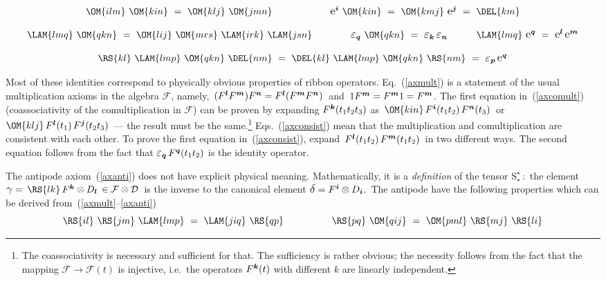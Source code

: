 \documentclass[12pt]{article}
\newcommand{\Del}{\mbox{\large$\delta$}}
\newcommand{\Gam}{\mbox{\large$\gamma$}}
\newcommand{\Eps}{\mbox{\large$\varepsilon$}}
\newcommand{\rE}{\mbox{\large$\mathrm e$}}
\newcommand{\rS}{\mathrm{S}}
\newcommand*{\boldind}[1]{{\mbox{\scriptsize\boldmath$#1$}}}
\newcommand*{\RD}[1]{D_\boldind{#1}}
\newcommand*{\RF}[1]{F^\boldind{#1}}
\newcommand*{\EPS}[1]{\Eps_\boldind{#1}}
\newcommand*{\RE}[1]{\rE^\boldind{#1}}
\newcommand{\calD}{\mathcal{D}}
\newcommand{\calF}{\mathcal{F}}
\begin{document}
\begin{equation} \label{axcomult}
  \OM{ilm}\ \OM{kin}\ =\ \OM{klj}\ \OM{jmn} \qquad\qquad\qquad
  \RE{i}\ \OM{kin}\ =\ \OM{kmj}\ \RE{j}\ =\ \DEL{km}
\end{equation}

\begin{equation} \label{axconsist}
  \LAM{lmq}\ \OM{qkn}\ =\ \OM{lij}\ \OM{mrs}\ \LAM{irk}\ \LAM{jsn} \qquad\qquad
  \EPS{q}\ \OM{qkn}\ =\ \EPS{k}\,\EPS{n} \qquad\quad
  \LAM{lmq}\ \RE{q}\ =\ \RE{l}\,\RE{m}
\end{equation}

\begin{equation} \label{axanti}
  \RS{kl}\ \LAM{lmp}\ \OM{qkn}\ \DEL{nm}\ =\ 
  \DEL{kl}\ \LAM{lmp}\ \OM{qkn}\ \RS{nm}\ =\ \EPS{p}\,\RE{q}
\end{equation}
\medskip

Most of these identities correspond to physically obvious properties
of ribbon operators. Eq.~(\ref{axmult}) is a statement of the usual
multiplication axioms in the algebra $\calF$, namely,\,
$(\RF{l}\RF{m})\RF{n}=\RF{l}(\RF{m}\RF{n})$\, and\,
$1\RF{m}=\RF{m}1=\RF{m}$.  The first equation in~(\ref{axcomult})
(coassociativity of the comultiplication in $\calF$) can be proven by
expanding $\RF{k}(t_1t_2t_3)$ as\,
$\OM{kin}\,\RF{i}(t_1t_2)\,\RF{n}(t_3)$\, or\,
$\OM{klj}\,\RF{l}(t_1)\,\RF{j}(t_2t_3)$\, --- the result must be the
same.\footnote{ 
 The coassociativity is necessary and sufficient for that.  The
 sufficiency is rather obvious; the necessity follows from the fact
 that the mapping $\calF\to\calF(t)$ is injective, i.e.\ the operators
 $\RF{k}(t)$ with different {\boldmath$k$} are linearly independent.}
Eqs.~(\ref{axconsist}) mean that the multiplication and comultiplication
are consistent with each other. To prove the first equation
in~(\ref{axconsist}), expand\, $\RF{l}(t_1t_2)\,\RF{m}(t_1t_2)$\, in two
different ways. The second equation follows from the fact that
$\EPS{q}\,\RF{q}(t_1t_2)$ is the identity operator.

The antipode axiom~(\ref{axanti}) does not have explicit physical
meaning. Mathematically, it is a \emph{definition} of the tensor
$\rS^\star_\star$\,:\, the element 
$\Gam=\,\RS{lk}\,\RF{k}\otimes\RD{l}\,\in\calF\otimes\calD$\, is the inverse
to the canonical element $\Del=\RF{i}\otimes\RD{i}$.\, The antipode have the 
following properties which can be derived from~(\ref{axmult}--\ref{axanti})
\begin{equation} \label{propanti}
  \RS{il}\ \RS{jm}\ \LAM{lmp}\ =\ \LAM{jiq}\ \RS{qp} \qquad\qquad\quad
  \RS{pq}\ \OM{qij}\ =\ \OM{pml}\ \RS{mj}\ \RS{li}
\end{equation}
\end{document}
